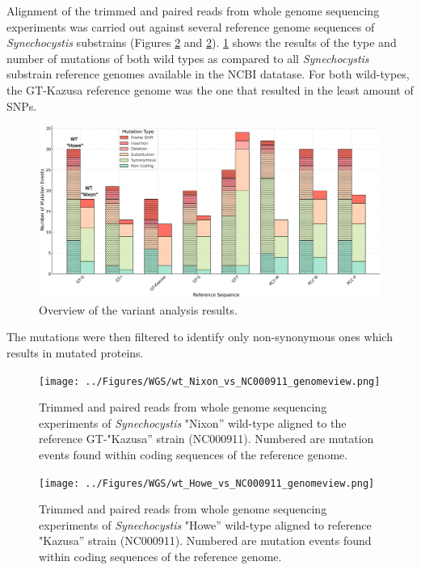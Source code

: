 \documentclass[12pt]{article}
\begin{document}
Alignment of the trimmed and paired reads from whole genome sequencing experiments was carried out against several reference genome sequences of \textit{Synechocystis} substrains (Figures \ref{fig:WTN_NC000911} and \ref{fig:WTN_NC000911}). \ref{fig:SNPs} shows the results of the type and number of mutations of both wild types as compared to all \textit{Synechocystis} substrain reference genomes available in the NCBI datatase. For both wild-types, the GT-Kazusa reference genome was the one that resulted in the least amount of SNPs.

\begin{figure}[H]
    \centering
    \includegraphics[width=\hsize]{../Figures/MV_adaptation/mutation_events_plot.png}
    \caption{Overview of the variant analysis results.}
    \label{fig:SNPs}
\end{figure}

The mutations were then filtered to identify only non-synonymous ones which results in mutated proteins. 

\begin{figure}[H]
    \centering
    \texttt{[image: ../Figures/WGS/wt\_Nixon\_vs\_NC000911\_genomeview.png]}
    \caption{Trimmed and paired reads from whole genome sequencing experiments of \textit{Synechocystis} "Nixon'' wild-type aligned to the reference GT-"Kazusa'' strain (NC000911). Numbered are mutation events found within coding sequences of the reference genome.}
    \label{fig:WTN_NC000911}
\end{figure}

\begin{figure}[H]
    \centering
    \texttt{[image: ../Figures/WGS/wt\_Howe\_vs\_NC000911\_genomeview.png]}
    \caption{Trimmed and paired reads from whole genome sequencing experiments of \textit{Synechocystis} "Howe'' wild-type aligned to reference "Kazusa'' strain (NC000911). Numbered are mutation events found within coding sequences of the reference genome.}
    \label{fig:WTH_NC000911}
\end{figure}
\end{document}
